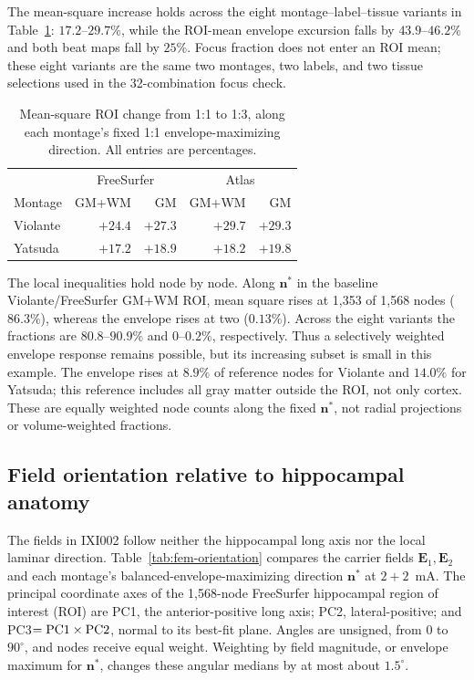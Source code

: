 \documentclass[11pt,a4paper]{article}
\providecommand{\DIFaddtex}[1]{{\protect\color{blue} \sf #1}} %
\providecommand{\DIFadd}[1]{\texorpdfstring{\DIFaddtex{#1}}{#1}} %
\begin{document}
\DIFadd{The mean-square increase holds across the eight montage--label--tissue
variants in Table~\ref{tab:fem-mean-variants}: $17.2$--$29.7\%$, while the
ROI-mean envelope excursion falls by $43.9$--$46.2\%$ and both beat maps fall by $25\%$.
Focus fraction does not enter an ROI mean; these eight variants are the
same two montages, two labels, and two tissue selections used in the
32-combination focus check.
}

\begin{table}[htbp]
\color{blue}\centering\small
\caption{\color{blue}Mean-square ROI change from 1:1 to 1:3, along each montage's fixed
1:1 envelope-maximizing direction. All entries are percentages.}
\label{tab:fem-mean-variants}
\begin{tabular}{@{}lrrrr@{}}
\toprule
& \multicolumn{2}{c}{FreeSurfer} & \multicolumn{2}{c}{Atlas}\\
Montage & GM+WM & GM & GM+WM & GM\\
\midrule
Violante & $+24.4$ & $+27.3$ & $+29.7$ & $+29.3$\\
Yatsuda & $+17.2$ & $+18.9$ & $+18.2$ & $+19.8$\\
\bottomrule
\end{tabular}
\end{table}

\DIFadd{The local inequalities hold node by node. Along $\mathbf n^*$ in the
baseline Violante/FreeSurfer GM+WM ROI, mean square rises at 1,353 of 1,568
nodes ($86.3\%$), whereas the envelope rises at two ($0.13\%$). Across the
eight variants the fractions are $80.8$--$90.9\%$ and $0$--$0.2\%$,
respectively. Thus a selectively weighted envelope response remains possible,
but its increasing subset is small in this example. The envelope rises at
$8.9\%$ of reference nodes for Violante and $14.0\%$ for Yatsuda; this
reference includes all gray matter outside the ROI, not only cortex.
These are equally weighted node counts along the fixed $\mathbf n^*$,
not radial projections or volume-weighted fractions.
}

\subsection{\DIFadd{Field orientation relative to hippocampal anatomy}}\label{supp:fem-orientation}
\DIFadd{The fields in IXI002 follow neither the hippocampal long axis nor the local
laminar direction. Table~\ref{tab:fem-orientation} compares the carrier fields
$\mathbf E_1,\mathbf E_2$ and each montage's balanced-envelope-maximizing
direction $\mathbf n^*$ at $2+2$~mA.
The principal coordinate axes of the 1,568-node FreeSurfer hippocampal region
of interest (ROI) are PC1, the anterior-positive long axis; PC2, lateral-positive; and
PC3$={\rm PC1}\times{\rm PC2}$, normal to its best-fit plane. Angles are
unsigned, from $0$ to $90^\circ$, and nodes receive equal weight.
Weighting by field magnitude, or envelope maximum for $\mathbf n^*$,
changes these angular medians by at most about $1.5^\circ$.
}
\end{document}
